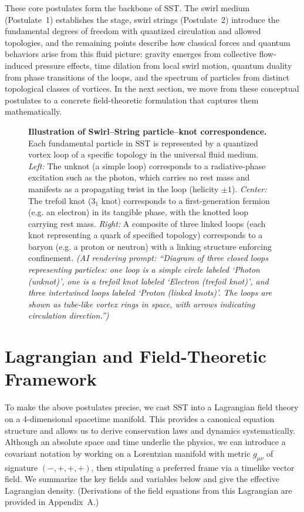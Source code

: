 \documentclass[10pt,reprint,aps,onecolumn,nofootinbib]{revtex4-2}
\begin{document}
These core postulates form the backbone of SST. The swirl medium (Postulate~1) establishes the stage, swirl strings (Postulate~2) introduce the fundamental degrees of freedom with quantized circulation and allowed topologies, and the remaining points describe how classical forces and quantum behaviors arise from this fluid picture: gravity emerges from collective flow-induced pressure effects, time dilation from local swirl motion, quantum duality from phase transitions of the loops, and the spectrum of particles from distinct topological classes of vortices. In the next section, we move from these conceptual postulates to a concrete field-theoretic formulation that captures them mathematically.


\begin{figure}[t]

\centering

\caption{\textbf{Illustration of Swirl–String particle–knot correspondence.} Each fundamental particle in SST is represented by a quantized vortex loop of a specific topology in the universal fluid medium. \emph{Left:} The unknot (a simple loop) corresponds to a radiative-phase excitation such as the photon, which carries no rest mass and manifests as a propagating twist in the loop (helicity $\pm 1$). \emph{Center:} The trefoil knot ($3_1$ knot) corresponds to a first-generation fermion (e.g. an electron) in its tangible phase, with the knotted loop carrying rest mass. \emph{Right:} A composite of three linked loops (each knot representing a quark of specified topology) corresponds to a baryon (e.g. a proton or neutron) with a linking structure enforcing confinement. \textit{(AI rendering prompt: “Diagram of three closed loops representing particles: one loop is a simple circle labeled ‘Photon (unknot)’, one is a trefoil knot labeled ‘Electron (trefoil knot)’, and three intertwined loops labeled ‘Proton (linked knots)’. The loops are shown as tube-like vortex rings in space, with arrows indicating circulation direction.”)}}

\end{figure}


\section{Lagrangian and Field-Theoretic Framework}

To make the above postulates precise, we cast SST into a Lagrangian field theory on a 4-dimensional spacetime manifold. This provides a canonical equation structure and allows us to derive conservation laws and dynamics systematically. Although an absolute space and time underlie the physics, we can introduce a covariant notation by working on a Lorentzian manifold with metric $g_{\mu\nu}$ of signature $(-,+,+,+)$, then stipulating a preferred frame via a timelike vector field. We summarize the key fields and variables below and give the effective Lagrangian density. (Derivations of the field equations from this Lagrangian are provided in Appendix~A.)
\end{document}
